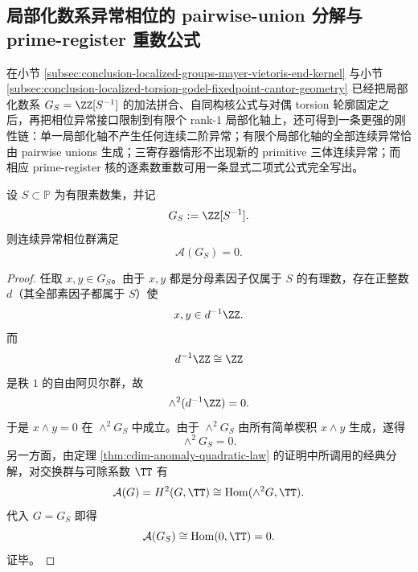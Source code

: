 \subsection{局部化数系异常相位的 pairwise-union 分解与 prime-register 重数公式}\label{subsec:conclusion-localized-anomaly-pairwise-union-prime-ledger}
在小节 \ref{subsec:conclusion-localized-groups-mayer-vietoris-end-kernel} 与小节 \ref{subsec:conclusion-localized-torsion-godel-fixedpoint-cantor-geometry} 已经把局部化数系 \(G_S=\ZZ[S^{-1}]\) 的加法拼合、自同构核公式与对偶 torsion 轮廓固定之后，再把相位异常接口限制到有限个 rank-\(1\) 局部化轴上，还可得到一条更强的刚性链：单一局部化轴不产生任何连续二阶异常；有限个局部化轴的全部连续异常恰由 pairwise unions 生成；三寄存器情形不出现新的 primitive 三体连续异常；而相应 prime-register 核的逐素数重数可用一条显式二项式公式完全写出。

\begin{theorem}[单一局部化数系的连续异常相位严格消失]\label{thm:conclusion-localized-single-axis-anomaly-vanishing}
设 \(S\subset\mathbb P\) 为有限素数集，并记
\[
G_S:=\ZZ[S^{-1}].
\]
则连续异常相位群满足
\[
\boxed{\;
\mathcal A(G_S)=0.\;}
\]
\end{theorem}
\begin{proof}
任取 \(x,y\in G_S\)。由于 \(x,y\) 都是分母素因子仅属于 \(S\) 的有理数，存在正整数 \(d\)（其全部素因子都属于 \(S\)）使
\[
x,y\in d^{-1}\ZZ.
\]
而
\[
d^{-1}\ZZ\cong \ZZ
\]
是秩 \(1\) 的自由阿贝尔群，故
\[
\wedge^2(d^{-1}\ZZ)=0.
\]
于是 \(x\wedge y=0\) 在 \(\wedge^2G_S\) 中成立。由于 \(\wedge^2G_S\) 由所有简单楔积 \(x\wedge y\) 生成，遂得
\[
\wedge^2G_S=0.
\]
另一方面，由定理 \ref{thm:cdim-anomaly-quadratic-law} 的证明中所调用的经典分解，对交换群与可除系数 \(\TT\) 有
\[
\mathcal A(G)=H^2(G,\TT)\cong \operatorname{Hom}(\wedge^2G,\TT).
\]
代入 \(G=G_S\) 即得
\[
\mathcal A(G_S)\cong \operatorname{Hom}(0,\TT)=0.
\]
证毕。
\end{proof}

